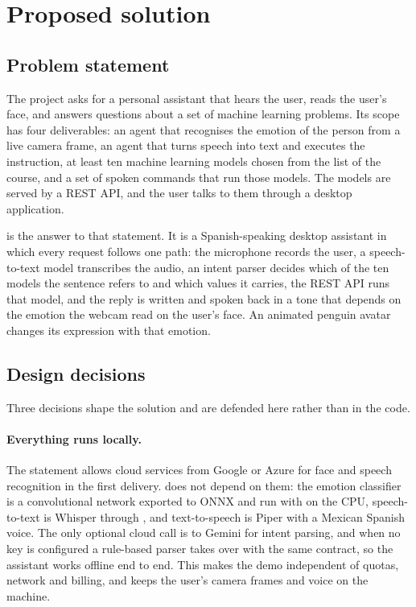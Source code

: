 \section{Proposed solution}
\label{sec:solution}

\subsection{Problem statement}

The project asks for a personal assistant that hears the user, reads the
user's face, and answers questions about a set of machine learning problems.
Its scope has four deliverables: an agent that recognises the emotion of the
person from a live camera frame, an agent that turns speech into text and
executes the instruction, at least ten machine learning models chosen from
the list of the course, and a set of spoken commands that run those models.
The models are served by a REST API, and the user talks to them through a
desktop application.

\jarvis{} is the answer to that statement. It is a Spanish-speaking desktop
assistant in which every request follows one path: the microphone records
the user, a speech-to-text model transcribes the audio, an intent parser
decides which of the ten models the sentence refers to and which values it
carries, the REST API runs that model, and the reply is written and spoken
back in a tone that depends on the emotion the webcam read on the user's
face. An animated penguin avatar changes its expression with that emotion.

\subsection{Design decisions}

Three decisions shape the solution and are defended here rather than in the
code.

\paragraph{Everything runs locally.}
The statement allows cloud services from Google or Azure for face and speech
recognition in the first delivery. \jarvis{} does not depend on them: the
emotion classifier is a convolutional network exported to ONNX and run with
 on the CPU, speech-to-text is Whisper
through , and text-to-speech is Piper with a Mexican
Spanish voice. The only optional cloud call is to Gemini for intent parsing,
and when no key is configured a rule-based parser takes over with the same
contract, so the assistant works offline end to end. This makes the demo
independent of quotas, network and billing, and keeps the user's camera
frames and voice on the machine.

